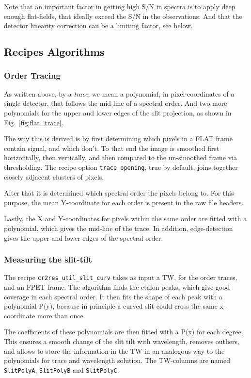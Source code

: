 Note that an important factor in getting high S/N in spectra is to apply deep
enough flat-fields, that ideally exceed the S/N in the observations. And that
the detector linearity correction can be a limiting factor, see below.

\subsection{Recipes Algorithms} 
\label{sec:algorithms-recipes}

\subsubsection{Order Tracing}
\label{sec:ordertrace}

As written above, by a \emph{trace}, we mean a polynomial, in pixel-coordinates
of a single detector, that follows the mid-line of a spectral order. And two
more polynomials for the upper and lower edges of the slit projection, as shown
in Fig.~\ref{fig:flat_trace}.

The way this is derived is by first determining which pixels in a FLAT frame
contain signal, and which don't. To that end the image is smoothed first
horizontally, then vertically, and then compared to the un-smoothed frame via
thresholding. The recipe option \verb!trace_opening!, true by default, joins
together closely adjacent clusters of pixels.

After that it is determined which spectral order the pixels belong to. For this
purpose, the mean Y-coordinate for each order is present in the raw file
headers.

Lastly, the X and Y-coordinates for pixels within the same order are fitted with
a polynomial, which gives the mid-line of the trace. In addition, edge-detection
gives the upper and lower edges of the spectral order.

\subsubsection{Measuring the slit-tilt}
\label{sec:tilt}

The recipe \verb!cr2res_util_slit_curv! takes as input a TW, for the order
traces, and an FPET frame. The algorithm finds the etalon peaks, which give good
coverage in each spectral order. It then fits the shape of each peak with a
polynomial P(y), because in principle a curved slit could cross the same
x-coordinate more than once.

The coefficients of these polynomials are then fitted with a P(x) for each
degree. This ensures a smooth change of the slit tilt with wavelength, removes
outliers, and allows to store the information in the TW in an analogous way to
the polynomials for trace and wavelength solution. The TW-columns are named
\verb!SlitPolyA!, \verb!SlitPolyB! and \verb!SlitPolyC!.


